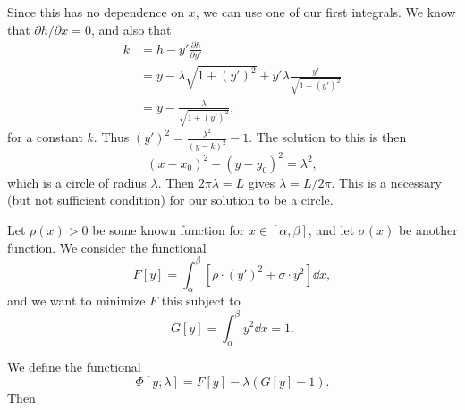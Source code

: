 \documentclass[a4paper]{scrartcl}
\begin{document}
\begin{example}
	Since this has no dependence on $x$, we can use one of our first integrals. We know that $\partial h/\partial x = 0$, and also that
	\begin{align*}
		k &= h - y' \frac{\partial h}{\partial y'} \\
		  &= y - \lambda \sqrt{1 + (y')^2} + y' \lambda \frac{y'}{\sqrt{1 + (y')^2}}\\
		  &= y - \frac{\lambda}{\sqrt{1 + (y')^2}},
	\end{align*}
	for a constant $k$. Thus $(y')^2 = \frac{\lambda^2}{(y - k)^2} - 1$. The solution to this is then
	$$
	(x - x_0)^2 + (y - y_0)^2 = \lambda^2,
	$$
	which is a circle of radius $\lambda$. Then $2\pi \lambda = L$ gives $\lambda = L/2\pi$. This is a necessary (but not sufficient condition) for our solution to be a circle.
\end{example}

\begin{example}
	Let $\rho(x) > 0$ be some known function for $x \in [\alpha, \beta]$, and let $\sigma(x)$ be another function. We consider the functional
	$$
	F[y] = \int_{\alpha}^{\beta} \left[\rho \cdot (y')^2 + \sigma \cdot y^2\right] \dd x,
	$$
	and we want to minimize $F$ this subject to
	$$
	G[y] = \int_\alpha^{\beta} y^2 \dd x = 1.
	$$

	We define the functional
	$$
	\Phi[y; \lambda] = F[y] - \lambda \left(G[y] - 1\right).
	$$
	Then 
\end{example}
\end{document}
